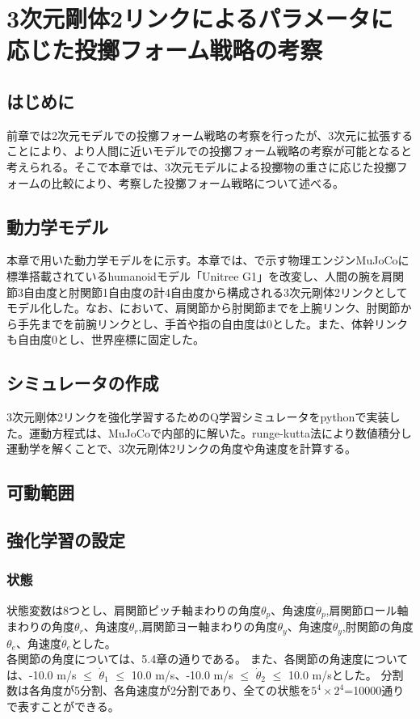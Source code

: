 \chapter[3次元剛体2リンクによるパラメータに応じた投擲フォーム戦略の考察]{3次元剛体2リンクによるパラメータに応じた投擲フォーム戦略の考察}

\section{はじめに}
前章では2次元モデルでの投擲フォーム戦略の考察を行ったが、3次元に拡張することにより、より人間に近いモデルでの投擲フォーム戦略の考察が可能となると考えられる。そこで本章では、3次元モデルによる投擲物の重さに応じた投擲フォームの比較により、考察した投擲フォーム戦略について述べる。
\section{動力学モデル}
本章で用いた動力学モデルをに示す。本章では、で示す物理エンジンMuJoCoに標準搭載されているhumanoidモデル「Unitree G1」を改変し、人間の腕を肩関節3自由度と肘関節1自由度の計4自由度から構成される3次元剛体2リンクとしてモデル化した。なお、において、肩関節から肘関節までを上腕リンク、肘関節から手先までを前腕リンクとし、手首や指の自由度は0とした。また、体幹リンクも自由度0とし、世界座標に固定した。
\section{シミュレータの作成}
3次元剛体2リンクを強化学習するためのQ学習シミュレータをpythonで実装した。運動方程式は、MuJoCoで内部的に解いた。runge-kutta法により数値積分し運動学を解くことで、3次元剛体2リンクの角度や角速度を計算する。
\section{可動範囲}
\section{強化学習の設定}
\subsection{状態}
状態変数は8つとし、肩関節ピッチ軸まわりの角度$\theta_{p}$、角速度$\dot{\theta}_{p}$,肩関節ロール軸まわりの角度$\theta_{r}$、角速度$\dot{\theta}_{r}$,肩関節ヨー軸まわりの角度$\theta_{y}$、角速度$\dot{\theta}_{y}$,肘関節の角度$\theta_{e}$、角速度$\dot{\theta}_{e}$とした。\\
各関節の角度については、5.4章の通りである。
また、各関節の角速度については、-10.0 m/s $\le$ $\dot{\theta}_{1}$ $\le$ 10.0 m/s、-10.0 m/s $\le$ $\dot{\theta}_{2}$ $\le$ 10.0 m/sとした。
分割数は各角度が5分割、各角速度が2分割であり、全ての状態を$5^{4}\times 2^{4}$=10000通りで表すことができる。
